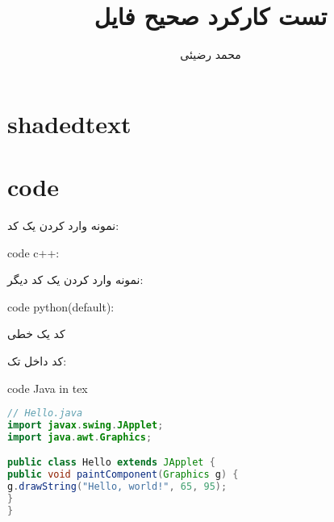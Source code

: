 \documentclass[12pt]{article}
\title{تست کارکرد صحیح فایل}
\author{محمد رضیئی}
\begin{document}
\maketitle

\section{shadedtext}
\ptext[1]
\begin{shadedtext}
	\ptext[1-10]
\end{shadedtext}
\ptext[1]

\section{code}
	نمونه وارد کردن یک کد:
\begin{latin}
\noindent code c++:

\end{latin}	

نمونه وارد کردن یک کد دیگر:
\begin{latin}
\noindent code python(default):

\end{latin}
کد یک خطی

کد داخل تک:
\begin{latin}
\noindent code Java in tex
\begin{lstlisting}[language = Java]
// Hello.java
import javax.swing.JApplet;
import java.awt.Graphics;

public class Hello extends JApplet {
public void paintComponent(Graphics g) {
g.drawString("Hello, world!", 65, 95);
}    
}
\end{lstlisting}
\end{latin}
\end{document}
